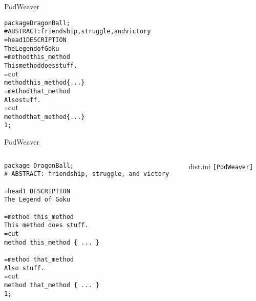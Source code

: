 \documentclass[serif,14pt,color=usenames,dvipsnames]{beamer}
\begin{document}
\begin{frame}{PodWeaver}        %
\begin{alltt}
\tiny
package DragonBall;\\
\# ABSTRACT: friendship, struggle, and victory\\
=head1 DESCRIPTION\\
The Legend of Goku\\
=method this\_method\\
This method does stuff.\\
=cut\\
method this\_method \{ ... \}\\
=method that\_method\\
Also stuff.\\
=cut\\
method that\_method \{ ... \}\\
1;\\
\end{alltt}
\end{frame}

\begin{frame}[fragile]{PodWeaver}        %
\begin{columns}[c]
\begin{column}{.5\textwidth}
\begin{overprint}
\begin{verbatim}
package DragonBall;
# ABSTRACT: friendship, struggle, and victory

=head1 DESCRIPTION
The Legend of Goku

=method this_method
This method does stuff.
=cut
method this_method { ... }

=method that_method
Also stuff.
=cut
method that_method { ... }
1;
\end{verbatim}
\end{overprint}
\end{column}
\begin{column}{.3\textwidth}
\pause
\begin{block}{dist.ini}
\texttt{[PodWeaver]} 
\end{block}
\end{column}
\end{columns}
\end{frame}
\end{document}
